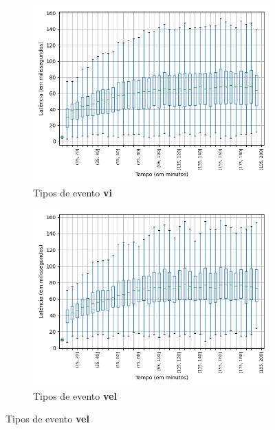 \begin{figure}
\begin{subfigure}{.5\textwidth}
\centering
\includegraphics[width=\textwidth]{figuras/graphics/boxplot_7-dez-is_vi.png}
\caption{Tipos de evento \textbf{vi}}
\label{fig:BoxPlot_vi_IS_7-dez-is}
\end{subfigure}%
\centering
\begin{subfigure}{.5\textwidth}
\centering
\includegraphics[width=\textwidth]{figuras/graphics/boxplot_7-dez-is_vel.png}
\caption{Tipos de evento \textbf{vel}}
\label{fig:BoxPlot_vel_IS_7-dez-is}
\end{subfigure}%


\end{figure}
